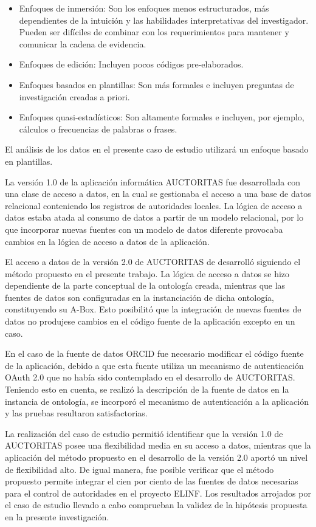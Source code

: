 \begin{itemize}
\item Enfoques de inmersión: Son los enfoques menos estructurados, más dependientes de la intuición y las habilidades interpretativas del investigador. Pueden ser difíciles de combinar con los requerimientos para mantener y comunicar la cadena de evidencia.
\item Enfoques de edición: Incluyen pocos códigos pre-elaborados.
\item Enfoques basados en plantillas: Son más formales e incluyen preguntas de investigación creadas a priori.
\item Enfoques quasi-estadísticos: Son altamente formales e incluyen, por ejemplo, cálculos o frecuencias de palabras o frases.
\end{itemize}

El análisis de los datos en el presente caso de estudio utilizará un enfoque basado en plantillas.

La versión 1.0 de la aplicación informática AUCTORITAS fue desarrollada con una clase de acceso a datos, en la cual se gestionaba el acceso a una base de datos relacional conteniendo los registros de autoridades locales. La lógica de acceso a datos estaba atada al consumo de datos a partir de un modelo relacional, por lo que incorporar nuevas fuentes con un modelo de datos diferente provocaba cambios en la lógica de acceso a datos de la aplicación.

El acceso a datos de la versión 2.0 de AUCTORITAS de desarrolló siguiendo el método propuesto en el presente trabajo. La lógica de acceso a datos se hizo dependiente de la parte conceptual de la ontología creada, mientras que las fuentes de datos son configuradas en la instanciación de dicha ontología, constituyendo su A-Box. Esto posibilitó que la integración de nuevas fuentes de datos no produjese cambios en el código fuente de la aplicación excepto en un caso.

En el caso de la fuente de datos ORCID fue necesario modificar el código fuente de la aplicación, debido a que esta fuente utiliza un mecanismo de autenticación OAuth 2.0 que no había sido contemplado en el desarrollo de AUCTORITAS. Teniendo esto en cuenta, se realizó la descripción de la fuente de datos en la instancia de ontología, se incorporó el mecanismo de autenticación a la aplicación y las pruebas resultaron satisfactorias.

La realización del caso de estudio permitió identificar que la versión 1.0 de AUCTORITAS posee una flexibilidad media en su acceso a datos, mientras que la aplicación del método propuesto en el desarrollo de la versión 2.0 aportó un nivel de flexibilidad alto. De igual manera, fue posible verificar que el método propuesto permite integrar el cien por ciento de las fuentes de datos necesarias para el control de autoridades en el proyecto ELINF. Los resultados arrojados por el caso de estudio llevado a cabo comprueban la validez de la hipótesis propuesta en la presente investigación.

